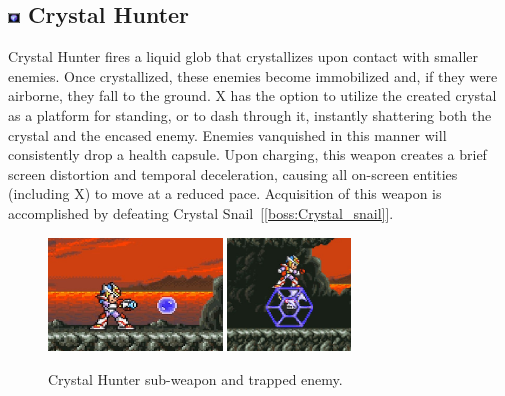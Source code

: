 \subsection{\includegraphics[width=12px, height=10px]{figures/X2/weapons/C_Hunter.png} Crystal Hunter}\label{Crystal_Hunter}

Crystal Hunter fires a liquid glob that crystallizes upon contact with smaller enemies. Once crystallized, these enemies become immobilized and, if they were airborne, they fall to the ground. X has the option to utilize the created crystal as a platform for standing, or to dash through it, instantly shattering both the crystal and the encased enemy. Enemies vanquished in this manner will consistently drop a health capsule. Upon charging, this weapon creates a brief screen distortion and temporal deceleration, causing all on-screen entities (including X) to move at a reduced pace. Acquisition of this weapon is accomplished by defeating Crystal Snail~[\ref{boss:Crystal_snail}].

\begin{figure}[htp]
	\centering
		\includegraphics[height=3cm]{figures/X2/weapons/C_Hunter_1.png}	
		\includegraphics[height=3cm]{figures/X2/weapons/C_Hunter_2.png}	
	\caption{Crystal Hunter sub-weapon and trapped enemy.}
\end{figure}

